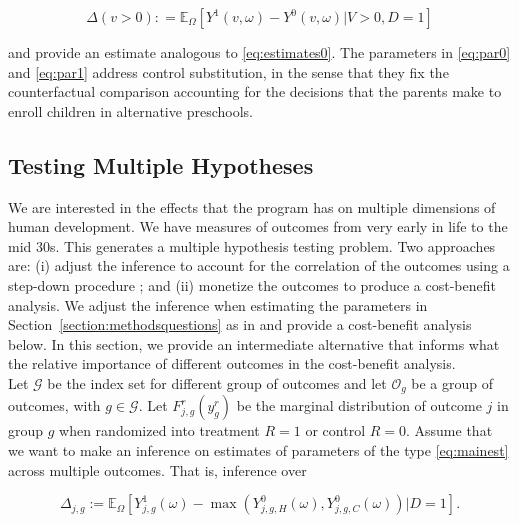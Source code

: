 \begin{equation}
\Delta \left( v > 0 \right) : =   \mathbb{E}_{\Omega} \left[ Y^1 \left( v, \omega \right) - Y^0 \left( v, \omega \right) | V > 0, D = 1 \right] \label{eq:par1}
\end{equation}

\noindent and provide an estimate analogous to \eqref{eq:estimates0}. The parameters in \eqref{eq:par0} and \eqref{eq:par1} address control substitution, in the sense that they fix the counterfactual comparison accounting for the decisions that the parents make to enroll children in alternative preschools.

\subsection{Testing Multiple Hypotheses}  \label{section:counts}

\noindent We are interested in the effects that the program has on multiple dimensions of human development. We have measures of outcomes from very early in life to the mid 30s. This generates a multiple hypothesis testing problem. Two approaches are: (i) adjust the inference to account for the correlation of the outcomes using a step-down procedure \citep{Lehman_Romano_2005_AnnStat,Romano_Shaikh_2006_AnnStat}; and (ii) monetize the outcomes to produce a cost-benefit analysis. We adjust the inference when estimating the parameters in Section~\ref{section:methodsquestions} as in \citet{Lehman_Romano_2005_AnnStat,Romano_Shaikh_2006_AnnStat} and provide a cost-benefit analysis below. In this section, we provide an intermediate alternative that informs what the relative importance of different outcomes in the cost-benefit analysis.\\

\noindent Let $\mathcal{G}$ be the index set for different group of outcomes and let $\mathcal{O}_{g}$ be a group of outcomes, with $g \in \mathcal{G}$. Let $F_{j,g}^r \left( y_g^r\right) $ be the marginal distribution of outcome $j$ in group $g$ when randomized into treatment $R = 1$ or control $R = 0$. Assume that we want to make an inference on estimates of parameters of the type \eqref{eq:mainest} across multiple outcomes. That is, inference over 

\begin{equation}
\Delta_{j,g} := \mathbb{E}_{\Omega} \left[ Y_{j,g}^1 \left( \omega \right) -  \max \left(  Y_{j,g,H}^0 \left( \omega \right) ,  Y_{j,g,C}^0 \left( \omega \right)  \right) | D =1 \right]. 
\end{equation}

